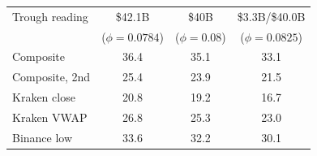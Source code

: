 \begin{tabular}{@{}lccc@{}}
\toprule
Trough reading & \$42.1B & \$40B & \$3.3B/\$40.0B \\
 & ($\phi=0.0784$) & ($\phi=0.08$) & ($\phi=0.0825$) \\
\midrule
Composite & 36.4 & 35.1 & 33.1 \\
Composite, 2nd & 25.4 & 23.9 & 21.5 \\
Kraken close & 20.8 & 19.2 & 16.7 \\
Kraken VWAP & 26.8 & 25.3 & 23.0 \\
Binance low & 33.6 & 32.2 & 30.1 \\
\bottomrule
\end{tabular}
